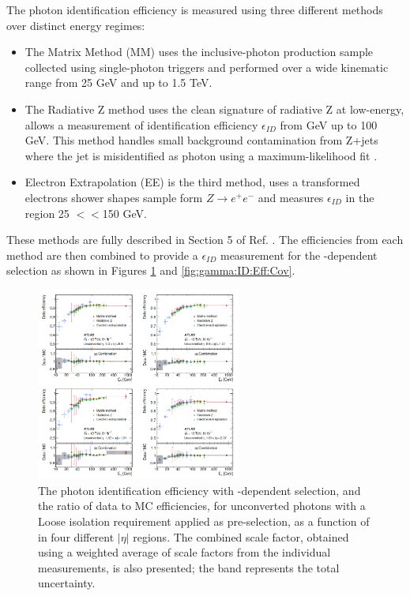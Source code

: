 The photon identification efficiency is measured using three different methods over distinct energy regimes:
\begin{itemize}
\item The Matrix Method (MM) uses the inclusive-photon production sample collected using single-photon triggers and performed over a wide kinematic range from 25 GeV and up to 1.5 TeV. 
\item The Radiative Z method uses the clean signature of radiative Z at low-energy, allows a measurement of identification efficiency $\epsilon_{ID}$ from  GeV up to 100 GeV. This method handles small background contamination from Z+jets where the jet is misidentified as photon using a maximum-likelihood fit \cite{Photon_Eff_Run1}. 
\item Electron Extrapolation (EE) is the third method, uses a transformed electrons shower shapes sample form $Z\rightarrow e^+e^-$ and measures $\epsilon_{ID}$ in the region 25 $<$\eT$<$150 GeV.
\end{itemize}
These methods are fully described in Section 5 of Ref. \cite{Photon_Eff_2015}. The efficiencies from each method are then combined to provide a $\epsilon_{ID}$ measurement for the \eT-dependent selection as shown in Figures \ref{fig:gamma:ID:Eff:UnCov} and \ref{fig:gamma:ID:Eff:Cov}. 
\begin{figure}[ht]
    \centering
    \includegraphics[width=0.6\textwidth]{Ch3/Img/Unconverted_Eff_2017.png}
    \caption{The photon identification efficiency with \eT-dependent selection, and the ratio of data to MC efficiencies, for unconverted photons with a Loose isolation requirement applied as pre-selection, as a function of \eT in four different $|\eta|$ regions. The combined scale factor, obtained using a weighted average of scale factors from the individual measurements, is also presented; the band represents the total uncertainty.}
    \label{fig:gamma:ID:Eff:UnCov}
\end{figure}
